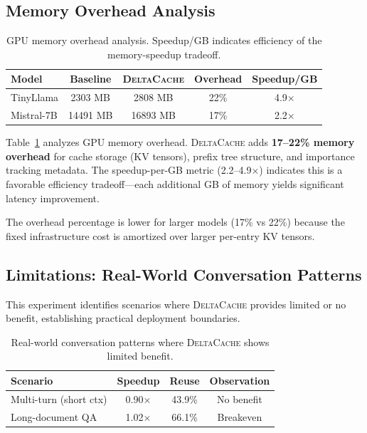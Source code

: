 \documentclass[10pt,conference]{IEEEtran}
\newcommand{\deltacache}{\textsc{DeltaCache}}
\begin{document}
\subsection{Memory Overhead Analysis}

\begin{table}[t]
\centering
\caption{GPU memory overhead analysis. Speedup/GB indicates efficiency of the memory-speedup tradeoff.}
\label{tab:memory}
\begin{tabular}{lcccc}
\toprule
Model & Baseline & \deltacache{} & Overhead & Speedup/GB \\
\midrule
TinyLlama & 2303 MB & 2808 MB & 22\% & 4.9$\times$ \\
Mistral-7B & 14491 MB & 16893 MB & 17\% & 2.2$\times$ \\
\bottomrule
\end{tabular}
\end{table}

Table~\ref{tab:memory} analyzes GPU memory overhead. \deltacache{} adds \textbf{17--22\% memory overhead} for cache storage (KV tensors), prefix tree structure, and importance tracking metadata. The speedup-per-GB metric (2.2--4.9$\times$) indicates this is a favorable efficiency tradeoff---each additional GB of memory yields significant latency improvement.

The overhead percentage is lower for larger models (17\% vs 22\%) because the fixed infrastructure cost is amortized over larger per-entry KV tensors.

\subsection{Limitations: Real-World Conversation Patterns}

This experiment identifies scenarios where \deltacache{} provides limited or no benefit, establishing practical deployment boundaries.

\begin{table}[t]
\centering
\caption{Real-world conversation patterns where \deltacache{} shows limited benefit.}
\label{tab:limitations}
\begin{tabular}{lccc}
\toprule
Scenario & Speedup & Reuse & Observation \\
\midrule
Multi-turn (short ctx) & 0.90$\times$ & 43.9\% & No benefit \\
Long-document QA & 1.02$\times$ & 66.1\% & Breakeven \\
\bottomrule
\end{tabular}
\end{table}
\end{document}
